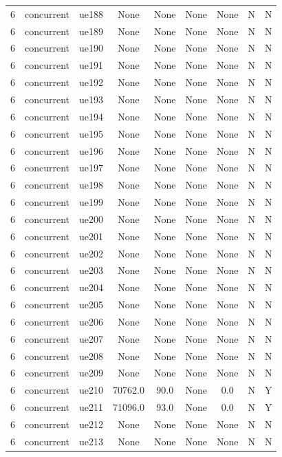 \begin{table}[ht]
\begin{tabular}{|c|c|c|c|c|c|c|c|c|}
6 & concurrent & ue188 & None & None & None & None & N & N \\
6 & concurrent & ue189 & None & None & None & None & N & N \\
6 & concurrent & ue190 & None & None & None & None & N & N \\
6 & concurrent & ue191 & None & None & None & None & N & N \\
6 & concurrent & ue192 & None & None & None & None & N & N \\
6 & concurrent & ue193 & None & None & None & None & N & N \\
6 & concurrent & ue194 & None & None & None & None & N & N \\
6 & concurrent & ue195 & None & None & None & None & N & N \\
6 & concurrent & ue196 & None & None & None & None & N & N \\
6 & concurrent & ue197 & None & None & None & None & N & N \\
6 & concurrent & ue198 & None & None & None & None & N & N \\
6 & concurrent & ue199 & None & None & None & None & N & N \\
6 & concurrent & ue200 & None & None & None & None & N & N \\
6 & concurrent & ue201 & None & None & None & None & N & N \\
6 & concurrent & ue202 & None & None & None & None & N & N \\
6 & concurrent & ue203 & None & None & None & None & N & N \\
6 & concurrent & ue204 & None & None & None & None & N & N \\
6 & concurrent & ue205 & None & None & None & None & N & N \\
6 & concurrent & ue206 & None & None & None & None & N & N \\
6 & concurrent & ue207 & None & None & None & None & N & N \\
6 & concurrent & ue208 & None & None & None & None & N & N \\
6 & concurrent & ue209 & None & None & None & None & N & N \\
6 & concurrent & ue210 & 70762.0 & 90.0 & None & 0.0 & N & Y \\
6 & concurrent & ue211 & 71096.0 & 93.0 & None & 0.0 & N & Y \\
6 & concurrent & ue212 & None & None & None & None & N & N \\
6 & concurrent & ue213 & None & None & None & None & N & N \\

\end{tabular}
\end{table}
